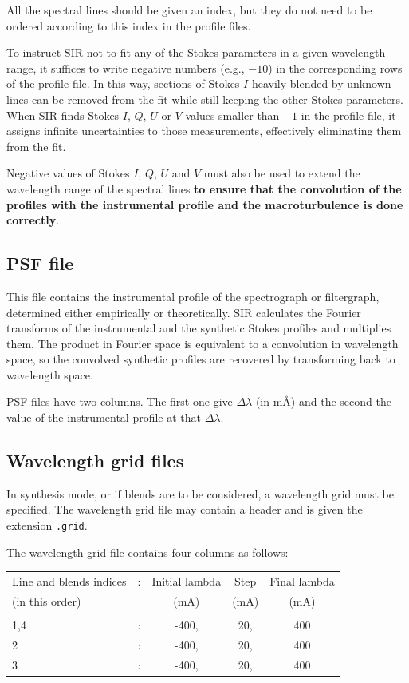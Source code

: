 \documentclass[11pt]{report}
\begin{document}
All the spectral lines should be given an index, but they 
do not need to be ordered according to this index in the profile 
files. 

To instruct SIR not to fit any of the Stokes parameters in a
given wavelength range, it suffices to write negative numbers 
(e.g., $-10$) in the corresponding rows of the profile file. In this
way, sections of Stokes $I$ heavily blended by unknown lines can be 
removed from the fit while still keeping the other Stokes parameters. 
When SIR finds Stokes $I$, $Q$, $U$ or $V$ values smaller than $-1$ 
in the profile file, it assigns infinite uncertainties to those 
measurements, effectively eliminating them from the fit. 

Negative values of Stokes $I$, $Q$, $U$ and $V$ must also be used
to extend the wavelength range of the spectral lines {\bf to ensure
that the convolution of the profiles with the instrumental profile
and the macroturbulence is done correctly}.  

\subsection{PSF file}
This file contains the instrumental profile of the spectrograph or
filtergraph, determined either empirically or theoretically. SIR 
calculates the Fourier transforms of the instrumental and the 
synthetic Stokes profiles and multiplies them. The product in 
Fourier space is equivalent to a convolution in wavelength 
space, so the convolved synthetic profiles are recovered 
by transforming back to wavelength space. 

PSF files have two columns. The first one give $\Delta \lambda$ (in
m\AA\/) and the second the value of the instrumental profile at 
that $\Delta \lambda$.

\subsection{Wavelength grid files}
In synthesis mode, or if blends are to be considered, a wavelength grid
must be specified. The wavelength grid file may contain a header and is 
given the extension {\tt .grid}.

The wavelength grid file contains four columns as follows:
\begin{center}
\begin{tabular}{lcccc}
Line and blends indices  & : &  Initial lambda &     Step  &    Final lambda \\
(in this order)          & &          (mA)    &       (mA) &         (mA)  \\
& & & & \\
1,4                      &  : &        -400,  &         20,  &        400 \\
2                        &  : &        -400,  &         20,  &        400 \\ 
3                        &  : &        -400,  &         20,  &        400 \\
\end{tabular}
\end{center} 
\end{document}
